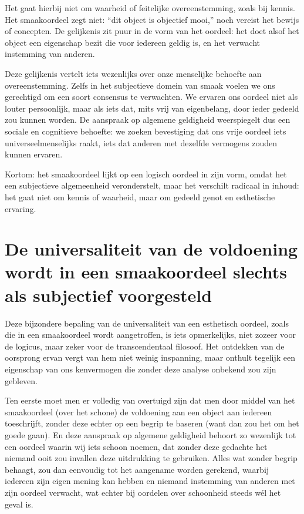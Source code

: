 \begin{mdframed}[leftmargin=0pt,rightmargin=0pt,backgroundcolor=blue!6,linecolor=white,innertopmargin=6pt,innerbottommargin=6pt]
Het gaat hierbij niet om waarheid of feitelijke overeenstemming, zoals bij kennis. Het smaakoordeel zegt niet: “dit object is objectief mooi,” noch vereist het bewijs of concepten. De gelijkenis zit puur in de vorm van het oordeel: het doet alsof het object een eigenschap bezit die voor iedereen geldig is, en het verwacht instemming van anderen.

Deze gelijkenis vertelt iets wezenlijks over onze menselijke behoefte aan overeenstemming. Zelfs in het subjectieve domein van smaak voelen we ons gerechtigd om een soort consensus te verwachten. We ervaren ons oordeel niet als louter persoonlijk, maar als iets dat, mits vrij van eigenbelang, door ieder gedeeld zou kunnen worden. De aanspraak op algemene geldigheid weerspiegelt dus een sociale en cognitieve behoefte: we zoeken bevestiging dat ons vrije oordeel iets universeelmenselijks raakt, iets dat anderen met dezelfde vermogens zouden kunnen ervaren.

Kortom: het smaakoordeel lijkt op een logisch oordeel in zijn vorm, omdat het een subjectieve algemeenheid veronderstelt, maar het verschilt radicaal in inhoud: het gaat niet om kennis of waarheid, maar om gedeeld genot en esthetische ervaring.
\end{mdframed}

\section{De universaliteit van de voldoening wordt in een smaakoordeel slechts als subjectief voorgesteld}

Deze bijzondere bepaling van de universaliteit van een esthetisch oordeel, zoals die in een smaakoordeel wordt aangetroffen, is iets opmerkelijks, niet zozeer voor de logicus, maar zeker voor de transcendentaal filosoof. Het ontdekken van de oorsprong ervan vergt van hem niet weinig inspanning, maar onthult tegelijk een eigenschap van ons kenvermogen die zonder deze analyse onbekend zou zijn gebleven.

Ten eerste moet men er volledig van overtuigd zijn dat men door middel van het smaakoordeel (over het schone) de voldoening aan een object aan iedereen toeschrijft, zonder deze echter op een begrip te baseren (want dan zou het om het goede gaan). En deze aanspraak op algemene geldigheid behoort zo wezenlijk tot een oordeel waarin wij iets schoon noemen, dat zonder deze gedachte het niemand ooit zou invallen deze uitdrukking te gebruiken. Alles wat zonder begrip behaagt, zou dan eenvoudig tot het aangename worden gerekend, waarbij iedereen zijn eigen mening kan hebben en niemand instemming van anderen met zijn oordeel verwacht, wat echter bij oordelen over schoonheid steeds wél het geval is.

